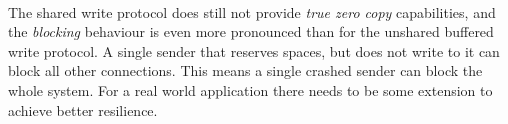 \paragraph{} The shared write protocol does still not provide \emph{true zero copy} capabilities, and the \emph{blocking}
behaviour is even more pronounced than for the unshared buffered write protocol. A single sender that reserves spaces, but does not
write to it can block all other connections. This means a single crashed sender can block the whole system. For a real world
application there needs to be some extension to achieve better resilience.

